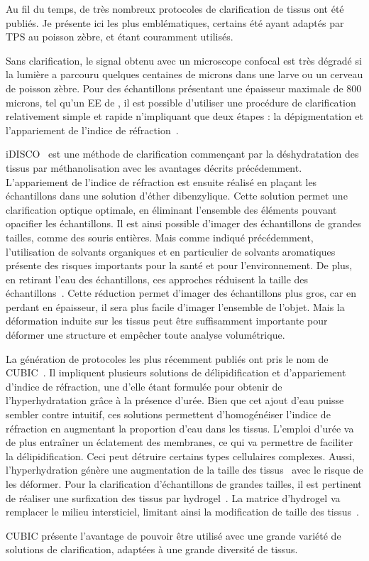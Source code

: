 \documentclass[\main/main.tex]{subfiles}
\begin{document}
%
Au fil du temps, de très nombreux protocoles de clarification de tissus ont été publiés. Je présente ici les plus emblématiques, certains été ayant adaptés par TPS au poisson zèbre, et étant couramment utilisés.
%


Sans clarification, le signal obtenu avec un microscope confocal est très dégradé si la lumière a parcouru quelques centaines de microns dans une larve ou un cerveau de poisson zèbre.
Pour des échantillons présentant une épaisseur maximale de 800 microns, tel qu'un EE de \pz{}, il est possible d'utiliser une procédure de clarification relativement simple et rapide n'impliquant que deux étapes : la dépigmentation et l'appariement de l'indice de réfraction~\cite{affaticati_2018}.

iDISCO~\cite{renier_2014} est une méthode de clarification commençant par la déshydratation des tissus par méthanolisation avec les avantages décrits précédemment. 
%
L'appariement de l'indice de réfraction est ensuite réalisé en plaçant les échantillons dans une solution d'éther dibenzylique.
%
Cette solution permet une clarification optique optimale, en éliminant l'ensemble des éléments pouvant opacifier les échantillons.
%
Il est ainsi possible d'imager des échantillons de grandes tailles, comme des souris entières.
Mais comme indiqué précédemment, l'utilisation de solvants organiques et en particulier de solvants aromatiques présente des risques importants pour la santé et pour l'environnement.
%
De plus, en retirant l'eau des échantillons, ces approches réduisent la taille des échantillons~\cite{frtaud_2017}.
%
Cette réduction permet d'imager des échantillons plus gros, car en perdant en épaisseur, il sera plus facile d'imager l'ensemble de l'objet.
%
Mais la déformation induite sur les tissus peut être suffisamment importante pour déformer une structure et empêcher toute analyse volumétrique.


La génération de protocoles les plus récemment publiés ont pris le nom de CUBIC~\cite{susaki_2014,susaki_2015}.
%
Il impliquent plusieurs solutions de délipidification et d'appariement d'indice de réfraction, une d'elle étant formulée pour obtenir de l'hyperhydratation grâce à la présence d'urée. Bien que cet ajout d'eau puisse sembler contre intuitif, ces solutions permettent d'homogénéiser l'indice de réfraction en augmentant la proportion d'eau dans les tissus.
L'emploi d'urée va de plus entraîner un éclatement des membranes, ce qui va permettre de faciliter la délipidification. Ceci peut détruire certains types cellulaires complexes. Aussi, l'hyperhydration génère une augmentation de la taille des tissus~\cite{frtaud_2017} avec le risque de les déformer.
%
Pour la clarification d'échantillons de grandes tailles, il est pertinent de réaliser une surfixation des tissus par hydrogel~\cite{chung_2013,richardson_2020}.
%
La matrice d'hydrogel va remplacer le milieu intersticiel, limitant ainsi la modification de taille des tissus~\cite{frtaud_2017}.

%
CUBIC présente l'avantage de pouvoir être utilisé avec une grande variété de solutions de clarification, adaptées à une grande diversité de tissus.
%
\end{document}
